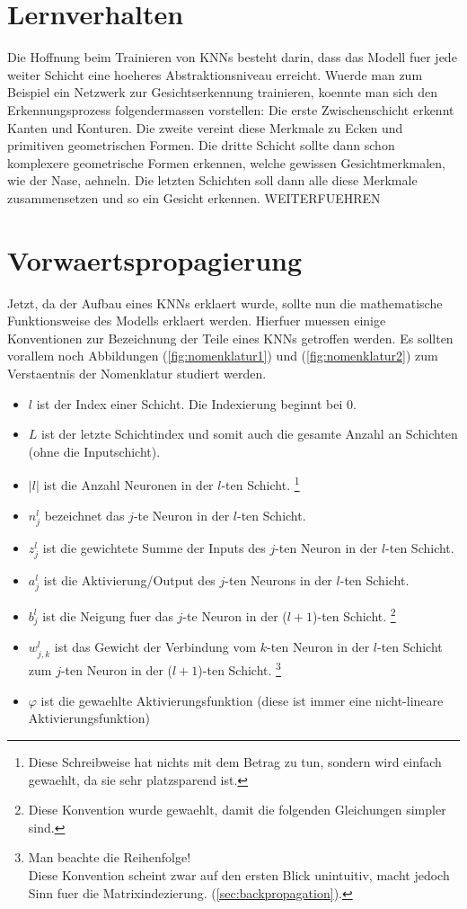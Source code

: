 \section{Lernverhalten}
Die Hoffnung beim Trainieren von KNNs besteht darin, dass das Modell fuer jede
weiter Schicht eine hoeheres Abstraktionsniveau erreicht. Wuerde man zum
Beispiel ein Netzwerk zur Gesichtserkennung trainieren, koennte man sich den
Erkennungsprozess folgendermassen vorstellen: Die erste Zwischenschicht erkennt
Kanten und Konturen. Die zweite vereint diese Merkmale zu Ecken und primitiven
geometrischen Formen. Die dritte Schicht sollte dann schon komplexere
geometrische Formen erkennen, welche gewissen Gesichtmerkmalen, wie der Nase, aehneln. Die letzten Schichten soll dann alle diese
Merkmale zusammensetzen und so ein Gesicht erkennen.
WEITERFUEHREN

\section{Vorwaertspropagierung}
Jetzt, da der Aufbau eines KNNs erklaert wurde, sollte nun die mathematische Funktionsweise
des Modells erklaert werden. Hierfuer muessen einige Konventionen zur
Bezeichnung der Teile eines KNNs getroffen werden. Es sollten vorallem noch
Abbildungen (\ref{fig:nomenklatur1}) und (\ref{fig:nomenklatur2}) zum
Verstaentnis der Nomenklatur studiert werden.
\begin{itemize}
\item{$l$ ist der Index einer Schicht. Die Indexierung beginnt bei 0.}
\item{$L$ ist der letzte Schichtindex und somit auch die gesamte Anzahl an
    Schichten (ohne die Inputschicht).}
\item{$|l|$ ist die Anzahl Neuronen in der $l$-ten Schicht.
    \footnote{
      Diese Schreibweise hat nichts mit dem Betrag zu tun, sondern wird einfach
      gewaehlt, da sie sehr platzsparend ist.
    }
  }
\item{$n_j^l$ bezeichnet das $j$-te Neuron in der $l$-ten Schicht.}
\item{$z_j^l$ ist die gewichtete Summe der Inputs des $j$-ten Neuron in der $l$-ten Schicht.}
\item{$a_j^l$ ist die Aktivierung/Output des $j$-ten Neurons in der $l$-ten Schicht.}
\item{$b_j^l$ ist die Neigung fuer das $j$-te Neuron in der ($l+1$)-ten Schicht.
    \footnote{
      Diese Konvention wurde gewaehlt, damit die folgenden Gleichungen simpler sind.
    }
  }
\item{$w_{j,k}^l$ ist das Gewicht der Verbindung vom $k$-ten Neuron
    in der $l$-ten Schicht zum $j$-ten Neuron in der ($l+1$)-ten Schicht.
    \footnote{
      Man beachte die Reihenfolge!\\
      Diese Konvention scheint zwar auf den ersten Blick unintuitiv, macht jedoch
      Sinn fuer die Matrixindezierung.
      (\ref{sec:backpropagation}).
    }
  }
\item{$\varphi$ ist die gewaehlte Aktivierungsfunktion (diese ist immer eine
    nicht-lineare Aktivierungsfunktion)}
\end{itemize}

